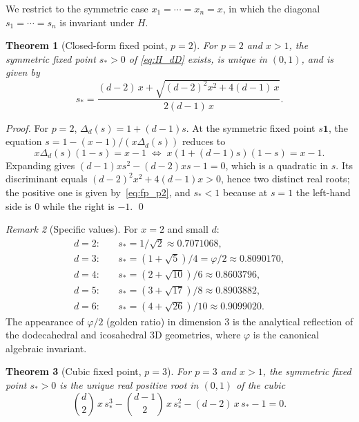 \documentclass[11pt,a4paper]{article}
\newtheorem{theorem}{Theorem}
\theoremstyle{definition}
\theoremstyle{remark}
\newtheorem{remark}[theorem]{Remark}
\newcommand{\one}{\mathbf{1}}
\begin{document}
We restrict to the symmetric case $x_1 = \cdots = x_n = x$, in which the
diagonal $s_1 = \cdots = s_n$ is invariant under $H$.

\begin{theorem}[Closed-form fixed point, $p=2$]
\label{thm:fp_p2}
For $p = 2$ and $x > 1$, the symmetric fixed point $s_* > 0$ of
\eqref{eq:H_dD} exists, is unique in $(0,1)$, and is given by
\begin{equation}
  \label{eq:fp_p2}
  s_* = \frac{(d-2)\, x + \sqrt{(d-2)^2 x^2 + 4(d-1)\, x}}{2(d-1)\, x}.
\end{equation}
\end{theorem}

\begin{proof}
For $p = 2$, $\Delta_d(s) = 1 + (d-1)s$.  At the symmetric fixed point
$s\one$, the equation $s = 1 - (x-1)/(x \Delta_d(s))$ reduces to
\[
  x \Delta_d(s)(1 - s) = x - 1
  \;\Longleftrightarrow\;
  x (1 + (d-1)s)(1-s) = x - 1.
\]
Expanding gives $(d-1) x s^2 - (d-2) x s - 1 = 0$, which is a quadratic
in $s$.  Its discriminant equals $(d-2)^2 x^2 + 4(d-1)x > 0$, hence two
distinct real roots; the positive one is given by~\eqref{eq:fp_p2}, and
$s_* < 1$ because at $s = 1$ the left-hand side is $0$ while the right
is $-1$. \qed
\end{proof}

\begin{remark}[Specific values]
For $x = 2$ and small $d$:
\begin{align*}
  d = 2: & \quad s_* = 1/\sqrt{2} \approx 0.7071068, \\
  d = 3: & \quad s_* = (1 + \sqrt{5})/4 = \varphi/2 \approx 0.8090170, \\
  d = 4: & \quad s_* = (2 + \sqrt{10})/6 \approx 0.8603796, \\
  d = 5: & \quad s_* = (3 + \sqrt{17})/8 \approx 0.8903882, \\
  d = 6: & \quad s_* = (4 + \sqrt{26})/10 \approx 0.9099020.
\end{align*}
The appearance of $\varphi/2$ (golden ratio) in dimension $3$ is the
analytical reflection of the dodecahedral and icosahedral 3D
geometries, where $\varphi$ is the canonical algebraic invariant.
\end{remark}

\begin{theorem}[Cubic fixed point, $p = 3$]
\label{thm:fp_p3}
For $p = 3$ and $x > 1$, the symmetric fixed point $s_* > 0$ is the
unique real positive root in $(0, 1)$ of the cubic
\begin{equation}
  \label{eq:fp_p3}
  \binom{d}{2}\, x\, s_*^3
  - \binom{d-1}{2}\, x\, s_*^2
  - (d - 2)\, x\, s_* - 1 = 0.
\end{equation}
\end{theorem}
\end{document}

